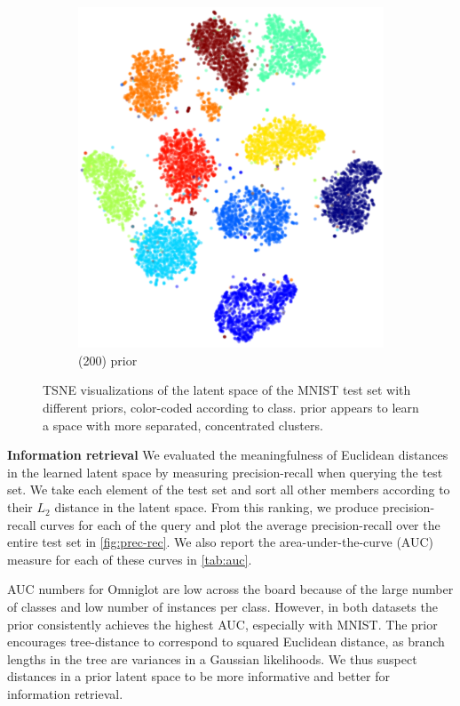 \begin{figure}[H]
\begin{subfigure}[t]{0.4\textwidth}
    \includegraphics[width=\textwidth]{img/loracs/mnist/tsne/mnist2-tsne-tmc.png}
    \caption{\acronym(200) prior}
\end{subfigure}
\caption{TSNE visualizations of the latent space of the MNIST test set with different priors,
color-coded according to class. \acronym\;prior appears to learn a space with more
separated, concentrated clusters.}
\label{fig:tsne-tmc-normal}
\end{figure}

\textbf{Information retrieval}
We evaluated the meaningfulness of Euclidean distances
in the learned latent space
by measuring precision-recall
when querying the test set.
We take each element of the test set
and sort all other members according to
their $L_2$ distance in the latent space.
From this ranking, we produce
precision-recall curves for each 
of the query and 
plot the average precision-recall
over the entire test set in \autoref{fig:prec-rec}.
We also report the area-under-the-curve (AUC)
measure for each of these curves in \autoref{tab:auc}.

AUC numbers for Omniglot are low across the board
because of the large number of classes
and low number of instances per class.
However,
in both datasets the \acronym\;prior consistently
achieves the highest AUC,
especially with MNIST. 
The \acronym\;prior encourages
tree-distance to correspond to
squared Euclidean distance, as branch
lengths in the tree are 
variances in a Gaussian likelihoods.
We thus suspect distances in a \acronym\;prior
latent space to be more informative
and better for information retrieval.

